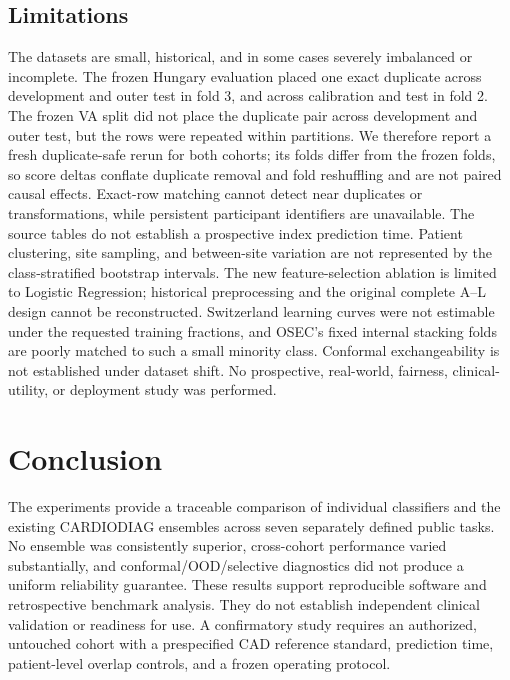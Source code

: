 \documentclass[conference]{IEEEtran}
\begin{document}
\subsection{Limitations}
The datasets are small, historical, and in some cases severely imbalanced or incomplete. The frozen Hungary evaluation placed one exact duplicate across development and outer test in fold 3, and across calibration and test in fold 2. The frozen VA split did not place the duplicate pair across development and outer test, but the rows were repeated within partitions. We therefore report a fresh duplicate-safe rerun for both cohorts; its folds differ from the frozen folds, so score deltas conflate duplicate removal and fold reshuffling and are not paired causal effects. Exact-row matching cannot detect near duplicates or transformations, while persistent participant identifiers are unavailable. The source tables do not establish a prospective index prediction time. Patient clustering, site sampling, and between-site variation are not represented by the class-stratified bootstrap intervals. The new feature-selection ablation is limited to Logistic Regression; historical preprocessing and the original complete A--L design cannot be reconstructed. Switzerland learning curves were not estimable under the requested training fractions, and OSEC's fixed internal stacking folds are poorly matched to such a small minority class. Conformal exchangeability is not established under dataset shift. No prospective, real-world, fairness, clinical-utility, or deployment study was performed.

\section{Conclusion}
The experiments provide a traceable comparison of individual classifiers and the existing CARDIODIAG ensembles across seven separately defined public tasks. No ensemble was consistently superior, cross-cohort performance varied substantially, and conformal/OOD/selective diagnostics did not produce a uniform reliability guarantee. These results support reproducible software and retrospective benchmark analysis. They do not establish independent clinical validation or readiness for use. A confirmatory study requires an authorized, untouched cohort with a prespecified CAD reference standard, prediction time, patient-level overlap controls, and a frozen operating protocol.
\end{document}
